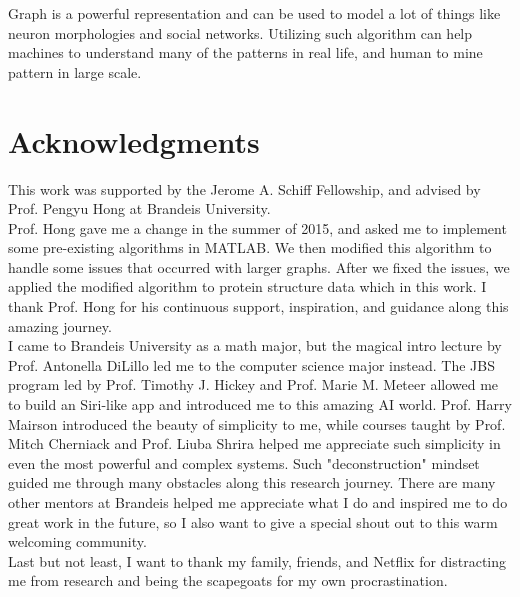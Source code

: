 Graph is a powerful representation and can be used to model a lot of things like neuron morphologies and social networks. Utilizing such algorithm can help machines to understand many of the patterns in real life, and human to mine pattern in large scale.

\chapter*{Acknowledgments}

This work was supported by the Jerome A. Schiff Fellowship, and advised by Prof. Pengyu Hong at Brandeis University.\\

Prof. Hong gave me a change in the summer of 2015, and asked me to implement some pre-existing algorithms in MATLAB. We then modified this algorithm to handle some issues that occurred with larger graphs. After we fixed the issues, we applied the modified algorithm to protein structure data which in this work. I thank Prof. Hong for his continuous support, inspiration, and guidance along this amazing journey.\\

I came to Brandeis University as a math major, but the magical intro lecture by Prof. Antonella DiLillo led me to the computer science major instead. The JBS program led by Prof. Timothy J. Hickey and Prof. Marie M. Meteer allowed me to build an Siri-like app and introduced me to this amazing AI world. Prof. Harry Mairson introduced the beauty of simplicity to me, while courses taught by Prof. Mitch Cherniack and Prof. Liuba Shrira helped me appreciate such simplicity in even the most powerful and complex systems. Such "deconstruction" mindset guided me through many obstacles along this research journey. There are many other mentors at Brandeis helped me appreciate what I do and inspired me to do great work in the future, so I also want to give a special shout out to this warm welcoming community.\\

Last but not least, I want to thank my family, friends, and Netflix for distracting me from research and being the scapegoats for my own procrastination.